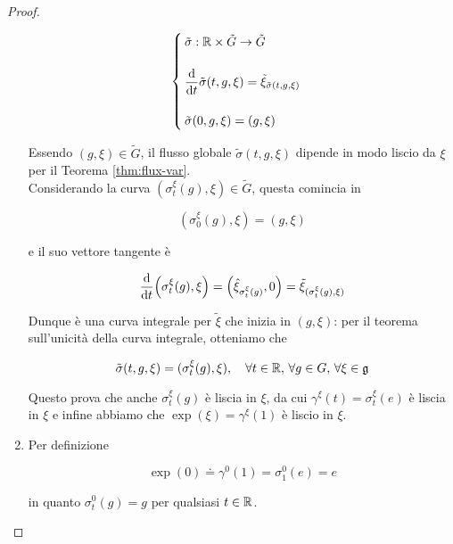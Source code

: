 \begin{proof}
\begin{enumerate}
		\begin{equation}
			\begin{cases}
				\tilde{\sigma} : \R \times \tilde{G} \to \tilde{G} \\\\
				\ddv{t} \tilde{\sigma}(t,g,\xi) = \tilde{\xi}_{\tilde{\sigma}(t,g,\xi)} \\\\
				\tilde{\sigma}(0,g,\xi) = (g,\xi)
			\end{cases}
		\end{equation}
	
		Essendo $ (g,\xi) \in \tilde{G} $, il flusso globale $ \tilde{\sigma}(t,g,\xi) $ dipende in modo liscio da $ \xi $ per il Teorema \ref{thm:flux-var}.\\
		Considerando la curva $ (\sigma_{t}^{\xi}(g),\xi) \in \tilde{G} $, questa comincia in
		
		\begin{equation}
			(\sigma_{0}^{\xi}(g),\xi) = (g,\xi)
		\end{equation}
	
		e il suo vettore tangente è
		
		\begin{equation}
			\dv{t} (\sigma_{t}^{\xi}(g),\xi) = \left( \hat{\xi}_{\sigma_{t}^{\xi}(g)}, 0 \right) = \tilde{\xi}_{(\sigma_{t}^{\xi}(g),\xi)}
		\end{equation}
	
		Dunque è una curva integrale per $ \tilde{\xi} $ che inizia in $ (g,\xi) $: per il teorema sull'unicità della curva integrale, otteniamo che
		
		\begin{equation}
			\tilde{\sigma}(t,g,\xi) = (\sigma_{t}^{\xi}(g),\xi) %
			\qcomma \forall t \in \R, \, \forall g \in G, \, \forall \xi \in \g
		\end{equation}
	
		Questo prova che anche $ \sigma_{t}^{\xi}(g) $ è liscia in $ \xi $, da cui $ \gamma^{\xi}(t) = \sigma_{t}^{\xi}(e) $ è liscia in $ \xi $ e infine abbiamo che $ \exp(\xi) = \gamma^{\xi}(1) $ è liscio in $ \xi $.
		
		\item Per definizione
		
		\begin{equation}
			\exp(0) \doteq \gamma^{0}(1) %
			= \sigma_{1}^{0}(e) %
			= e
		\end{equation}
	
		in quanto $ \sigma_{t}^{0}(g) = g $ per qualsiasi $ t \in \mathbb{R} $.
		

\end{enumerate}
\end{proof}
